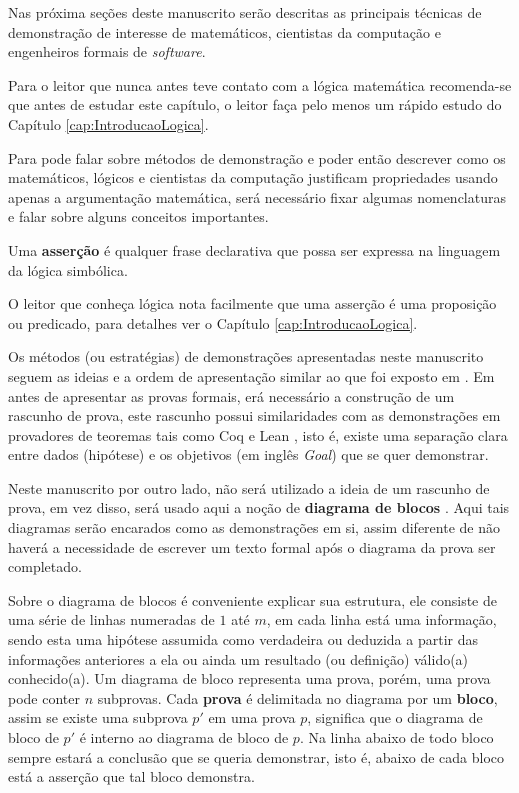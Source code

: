 Nas próxima seções deste manuscrito serão descritas as principais técnicas de demonstração de interesse de matemáticos, cientistas da computação e engenheiros formais de \textit{software}. 

\begin{remark}
	Para o leitor que nunca antes teve contato com a lógica matemática recomenda-se que antes de estudar este capítulo, o leitor faça pelo menos um rápido estudo do Capítulo \ref{cap:IntroducaoLogica}.
\end{remark}

Para pode falar sobre métodos de demonstração e poder então descrever como os matemáticos, lógicos e cientistas da computação justificam propriedades usando apenas a argumentação matemática, será necessário fixar algumas nomenclaturas e falar sobre alguns conceitos importantes.

\begin{definition}[Asserção]\label{def:Assercao}
	Uma \textbf{asserção} é qualquer frase declarativa que possa ser expressa na linguagem da lógica simbólica.
\end{definition}

\begin{remark}
	O leitor que conheça lógica nota facilmente que uma asserção é uma proposição ou predicado, para detalhes ver o Capítulo \ref{cap:IntroducaoLogica}.
\end{remark}

Os métodos (ou estratégias) de demonstrações apresentadas neste manuscrito seguem as ideias e a ordem  de apresentação similar ao que foi exposto em \cite{velleman2019comProvar}. Em \cite{velleman2019comProvar} antes de apresentar as provas formais, erá necessário a construção de um rascunho de prova, este rascunho possui similaridades com as demonstrações em provadores de teoremas tais como Coq \cite{coq2013} e Lean \cite{lean2015}, isto é, existe uma separação clara entre dados (hipótese) e os objetivos (em inglês \textit{Goal}) que se quer demonstrar. 

Neste manuscrito por outro lado, não será utilizado a ideia de um rascunho de prova, em vez disso, será usado aqui a noção de \textbf{diagrama de blocos} \cite{broda2007}. Aqui tais diagramas serão encarados como as demonstrações em si, assim diferente de \cite{velleman2019comProvar} não haverá a necessidade de escrever um texto formal após o diagrama da prova ser completado.

Sobre o diagrama de blocos é conveniente explicar sua estrutura, ele consiste de uma série de linhas numeradas de $1$ até $m$, em cada linha está uma informação, sendo esta uma hipótese assumida como verdadeira ou deduzida a partir das informações anteriores a ela ou ainda um resultado (ou definição) válido(a) conhecido(a). Um diagrama de bloco representa uma prova, porém, uma prova pode conter $n$ subprovas. Cada \textbf{prova} é delimitada no diagrama por um \textbf{bloco}, assim se existe uma subprova $p'$ em uma prova $p$, significa que o diagrama de bloco de $p'$ é interno ao diagrama de bloco de $p$. Na linha abaixo de todo bloco sempre estará a conclusão que se queria demonstrar, isto é, abaixo de cada bloco está a asserção que tal bloco demonstra.

